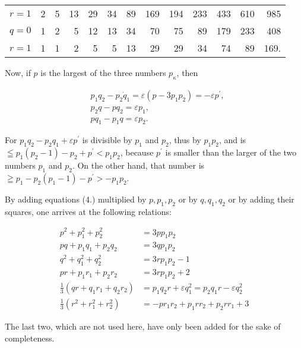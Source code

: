 \documentclass[12pt]{article}
\begin{document}
\bigskip

\begin{tabular}{rrrrrrrrrrrrr}
$r=1$ & 2 & 5 & 13 & 29 & 34 & 89 & 169 & 194 & 233 & 433 & 610 & 985 \\
$q=0$ & 1 & 2 & 5 & 12 & 13 & 34 & 70 & 75 & 89 & 179 & 233 & 408 \\
$r=1$ & 1 & 1 & 2 & 5 & 5 & 13 & 29 & 29 & 34 & 74 & 89 & 169.
\end{tabular}

\bigskip

Now, if $p$ is the largest of the three numbers $p_{\kappa}$, then

\begin{align*}
& p_{1} q_{2}-p_{2} \dot{q}_{1}=\varepsilon\left(p-3 p_{1} p_{2}\right)=-\varepsilon p^{\prime}, \\
& p_{2} q-p q_{2}=\varepsilon p_{1},  \tag{4.}\\
& p q_{1}-p_{1} q=\varepsilon p_{2} .
\end{align*}

For $p_{1} q_{2}-p_{2} q_{1}+\varepsilon p^{\prime}$ is divisible by $p_{1}$ and $p_{2}$, thus by $p_{1} p_{2}$, and is $\leqq p_{1}\left(p_{2}-1\right)-p_{2}+p^{\prime}<p_{1} p_{2}$, because $p^{\prime}$ is smaller than the larger of the two numbers $p_{1}$ and $p_{2}$. On the other hand, that number is $\geqq p_{1}-p_{2}\left(p_{1}-1\right)-p^{\prime} >-p_{1} p_{2}$.

By adding equations (4.) multiplied by $p, p_{1}, p_{2}$ or by $q, q_{1}, q_{2}$ or by adding their squares, one arrives at the following relations:

\begin{align*}
p^{2}+p_{1}^{2}+p_{2}^{2} & =3 p p_{1} p_{2} \\
p q+p_{1} q_{1}+p_{2} q_{2} & =3 q p_{1} p_{2} \\
q^{2}+q_{1}^{2}+q_{2}^{2} & =3 r p_{1} p_{2}-1 \\
p r+p_{1} r_{1}+p_{2} r_{2} & =3 r p_{1} p_{2}+2  \tag{5.}\\
\frac{1}{3}\left(q r+q_{1} r_{1}+q_{2} r_{2}\right) & =p_{1} q_{2} r+\varepsilon q_{1}^{2}=p_{2} q_{1} r-\varepsilon q_{2}^{2} \\
\frac{1}{3}\left(r^{2}+r_{1}^{2}+r_{2}^{2}\right) & =-p r_{1} r_{2}+p_{1} r r_{2}+p_{2} r r_{1}+3
\end{align*}

\medskip

The last two, which are not used here, have only been added for the sake of completeness.
\end{document}
